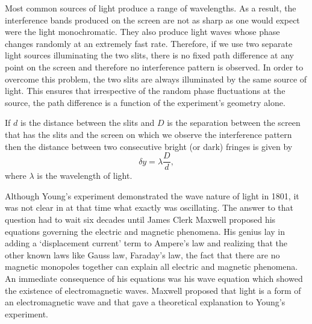 \documentclass[11pt]{article}
\numberwithin{equation}{section}
\begin{document}
Most common sources of light produce a range of wavelengths. As a result, the
interference bands produced on the screen are not as sharp as one would expect
were the light monochromatic. They also produce light waves whose phase 
changes randomly at an extremely fast rate. Therefore, if we use two separate
light sources illuminating the two slits, there is no fixed path difference
at any point on the screen and therefore no interference pattern is observed.
In order to overcome this problem, the two slits are always illuminated by 
the same source of light. This ensures that irrespective of the random phase
fluctuations at the source, the path difference is a function of the 
experiment's geometry alone.

If $d$ is the distance between the slits and $D$ is the separation between
the screen that has the slits and the screen on which we observe the 
interference pattern then the distance between two consecutive bright (or
dark) fringes is given by \cite{jenkins1937fundamentals}
\begin{equation}\label{s1e1}
\delta y = \lambda \frac{D}{d},
\end{equation}
where $\lambda$ is the wavelength of light.

Although Young's experiment demonstrated the wave nature of light in 1801, it 
was not clear in at that time what exactly was oscillating. The answer to that
question had to wait six decades until James Clerk Maxwell proposed his 
equations governing the electric and magnetic phenomena. His genius lay in 
adding a `displacement current' term to Ampere's law and realizing that the 
other known laws like Gauss law, Faraday's law, the fact that there are
no magnetic monopoles together can explain all electric and magnetic 
phenomena. An immediate consequence of his equations was his wave equation
which showed the existence of electromagnetic waves. Maxwell proposed that
light is a form of an electromagnetic wave and that gave a theoretical
explanation to Young's experiment.
\end{document}

